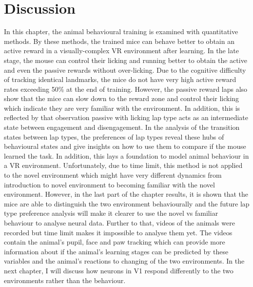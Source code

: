 \section{Discussion}
In this chapter, the animal behavioural training is examined with quantitative methods. By these methods, the trained mice can behave better to obtain an active reward in a visually-complex VR environment after learning. In the late stage, the mouse can control their licking and running better to obtain the active and even the passive rewards without over-licking. Due to the cognitive difficulty of tracking identical landmarks, the mice do not have very high active reward rates exceeding 50\% at the end of training. However, the passive reward laps also show that the mice can slow down to the reward zone and control their licking which indicate they are very familiar with the environment. In addition, this is reflected by that observation passive with licking lap type acts as an intermediate state between engagement and disengagement. In the analysis of the transition states between lap types, the preferences of lap types reveal these hubs of behavioural states and give insights on how to use them to compare if the mouse learned the task. In addition, this lays a foundation to model animal behaviour in a VR environment. Unfortunately, due to time limit, this method is not applied to the novel environment which might have very different dynamics from introduction to novel environment to becoming familiar with the novel environment. However, in the last part of the chapter results, it is shown that the mice are able to distinguish the two environment behaviourally and the future lap type preference analysis will make it clearer to use the novel vs familiar behaviour to analyse neural data. Further to that, videos of the animals were recorded but time limit makes it impossible to analyse them yet. The videos contain the animal's pupil, face and paw tracking which can provide more information about if the animal's learning stages can be predicted by these variables and the animal's reactions to changing of the two environments. In the next chapter, I will discuss how neurons in V1 respond differently to the two environments rather than the behaviour. 

